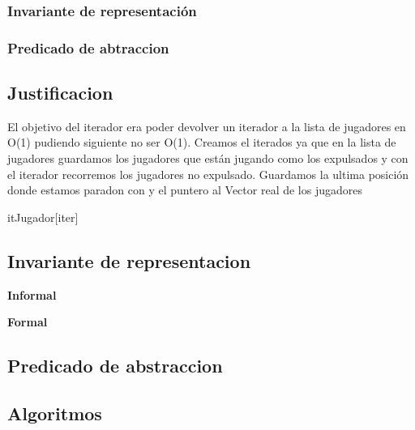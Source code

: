 \begin{Representacion}
\subsubsection{Invariante de representación}

\subsubsection{Predicado de abtraccion}


\subsection{Justificacion}
	El objetivo del iterador era poder devolver un iterador a la lista de jugadores en O(1) pudiendo siguiente no ser O(1). Creamos el iterados ya que en la lista de jugadores guardamos los jugadores que est\'an jugando como los expulsados y con el iterador recorremos los jugadores no expulsado. Guardamos la ultima posici\'on donde estamos paradon con y el puntero al Vector real de los jugadores
	
	\begin{Estructura}{itJugador}[iter]
		\begin{Tupla}[iter]
		\end{Tupla}
	\end{Estructura}
\subsection{Invariante de representacion}

\textbf{Informal}

\textbf{Formal}

\subsection{Predicado de abstraccion}

\end{Representacion}
\subsection{Algoritmos}

